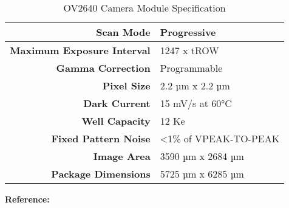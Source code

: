 \begin{center}
\begin{table}[htbp]
\begin{tabular}{|cc|l|}
            \multicolumn{2}{|r|}{\textbf{Scan Mode}}                                                                                                                  & Progressive                               \\ \hline
            \multicolumn{2}{|r|}{\textbf{Maximum Exposure Interval}}                                                                                                  & 1247 x tROW                               \\ \hline
            \multicolumn{2}{|r|}{\textbf{Gamma Correction}}                                                                                                           & Programmable                              \\ \hline
            \multicolumn{2}{|r|}{\textbf{Pixel Size}}                                                                                                                 & 2.2 µm x 2.2 µm                           \\ \hline
            \multicolumn{2}{|r|}{\textbf{Dark Current}}                                                                                                               & 15 mV/s at 60°C                           \\ \hline
            \multicolumn{2}{|r|}{\textbf{Well Capacity}}                                                                                                              & 12 Ke                                     \\ \hline
            \multicolumn{2}{|r|}{\textbf{Fixed Pattern Noise}}                                                                                                        & \textless{}1\% of VPEAK-TO-PEAK           \\ \hline
            \multicolumn{2}{|r|}{\textbf{Image Area}}                                                                                                                 & 3590 µm x 2684 µm                         \\ \hline
            \multicolumn{2}{|r|}{\textbf{Package Dimensions}}                                                                                                         & 5725 µm x 6285 µm                         \\ \hline
        \end{tabular}
        
        \caption{OV2640 Camera Module Specification}
        \begin{center}
            \footnotesize \textbf{Reference:} 
        \end{center}
        
    \end{table}
\end{center}

